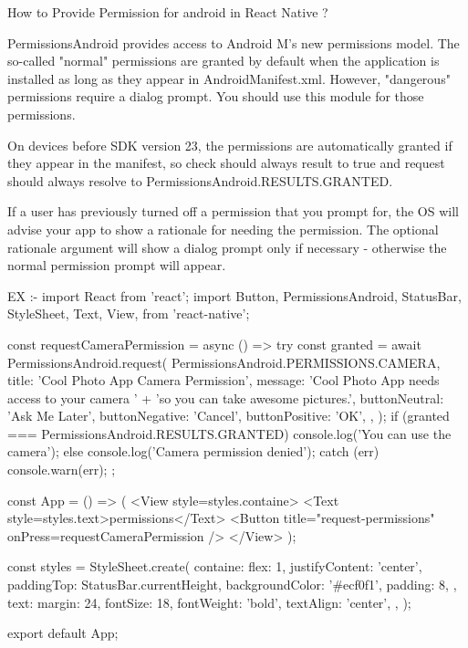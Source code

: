 How to Provide Permission for android in React Native ?

PermissionsAndroid provides access to Android M's new permissions model. 
The so-called "normal" permissions are granted by default when the 
application is installed as long as they appear in AndroidManifest.xml. 
However, "dangerous" permissions require a dialog prompt. 
You should use this module for those permissions.

On devices before SDK version 23, the permissions are automatically 
granted if they appear in the manifest, so check should always result 
to true and request should always resolve to PermissionsAndroid.RESULTS.GRANTED.

If a user has previously turned off a permission that you prompt for, 
the OS will advise your app to show a rationale for needing the permission. 
The optional rationale argument will show a dialog prompt only if necessary - 
otherwise the normal permission prompt will appear.



EX :- 
import React from 'react';
import {
  Button,
  PermissionsAndroid,
  StatusBar,
  StyleSheet,
  Text,
  View,
} from 'react-native';

const requestCameraPermission = async () => {
  try {
    const granted = await PermissionsAndroid.request(
      PermissionsAndroid.PERMISSIONS.CAMERA,
      {
        title: 'Cool Photo App Camera Permission',
        message:
          'Cool Photo App needs access to your camera ' +
          'so you can take awesome pictures.',
        buttonNeutral: 'Ask Me Later',
        buttonNegative: 'Cancel',
        buttonPositive: 'OK',
      },
    );
    if (granted === PermissionsAndroid.RESULTS.GRANTED) {
      console.log('You can use the camera');
    } else {
      console.log('Camera permission denied');
    }
  } catch (err) {
    console.warn(err);
  }
};

const App = () => (
  <View style={styles.containe}>
    <Text style={styles.text}>permissions</Text>
    <Button title="request-permissions" onPress={requestCameraPermission} />
  </View>
);

const styles = StyleSheet.create({
  containe: {
    flex: 1,
    justifyContent: 'center',
    paddingTop: StatusBar.currentHeight,
    backgroundColor: '#ecf0f1',
    padding: 8,
  },
  text: {
    margin: 24,
    fontSize: 18,
    fontWeight: 'bold',
    textAlign: 'center',
  },
});

export default App;